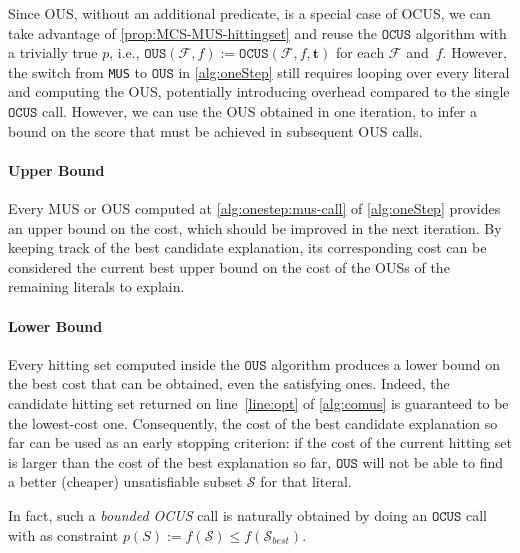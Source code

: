 \documentclass[twoside,11pt]{article}
\newcommand\m[1]{\mathcal{#1}}
\newcommand\comment[1]{\marginpar{\tiny #1}}
\renewcommand\comment[1]{#1}
\newcommand{\bart}[1]{{\comment{\color{OliveGreen}Bart: #1}}}
\newcommand\formula{\ensuremath{\m{F} }\xspace}
\newcommand\mm[1]{\ensuremath{#1}\xspace}
\newcommand\ltrue{\mm{\textbf{t}}}
\newcommand\call[1]{\mm{\texttt{#1}}}
\newcommand\omus{\mm{\call{OUS}}}
\newcommand\comus{\mm{\call{OCUS}}}
\begin{document}
Since OUS, without an additional predicate, is a special case of OCUS, we can take advantage of \cref{prop:MCS-MUS-hittingset} and reuse the \comus algorithm with a trivially true $p$, i.e., 
$\omus{}(\formula,f):=\comus{}(\formula,f,\ltrue) $ for each $\formula$ and~$f$. 
However, the switch from \texttt{MUS} to \omus{} in \cref{alg:oneStep} still requires looping over every literal and computing the OUS, potentially introducing overhead compared to the single \comus call. %
However, we can use the OUS obtained in one iteration, to infer a bound on the score that must be achieved in subsequent OUS calls.

\paragraph{Upper Bound} Every MUS or OUS computed at \cref{alg:onestep:mus-call} of \cref{alg:oneStep} provides an upper bound on the cost, which should be improved in the next iteration. %
By keeping track of the best candidate explanation, its corresponding cost can be considered the current best upper bound on the cost of the OUSs of the remaining literals to explain.

\paragraph{Lower Bound} Every hitting set computed inside the \omus{} algorithm produces a lower bound on the best cost that can be obtained, even the satisfying ones. Indeed, the candidate hitting set returned on line~\ref{line:opt} of \cref{alg:comus} is guaranteed to be the lowest-cost one. Consequently, the cost of the best candidate explanation so far can be used as an early stopping criterion: if the cost of the current hitting set is larger than the cost of the best explanation so far, \omus{} will not be able to find a better (cheaper) unsatisfiable subset $\m{S}$ for that literal.

In fact, such a \emph{bounded OCUS} call is naturally obtained by doing an \comus call with as constraint $p(S):= f(\m{S}) \leq f(\m{S}_{best})$.

\end{document}
